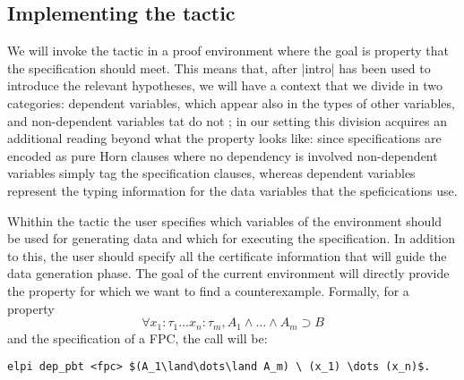 
\subsection{Implementing the tactic}
We will invoke the tactic in a
proof environment  where the goal is %
property that the specification should meet. This means that, after
\lsti|intro| has been used to introduce the relevant hypotheses, we
will have a context %
that we  divide in two categories: dependent
variables, which appear also in the types of other variables, and
non-dependent variables tat do not %
; in our setting this division acquires an additional reading beyond
what the property looks like: since specifications are encoded as pure
Horn clauses where no dependency is involved non-dependent variables
simply tag the specification clauses, whereas dependent variables
represent the typing information for the data variables that the
speficications use.

Whithin the tactic the user
specifies which variables of the environment should be used for
generating data and which for executing the specification. In addition
to this, the user should specify all the certificate information that
will guide the data generation phase. The goal of the current
environment will directly provide the property for which we want to
find a counterexample. %
Formally, for a property
\[
\forall x_1 \colon \tau_1\dots x_n \colon \tau_m, A_1\land\dots\land A_m \supset B
\]
and the specification of a FPC, the call will be:
\begin{lstlisting}
elpi dep_pbt <fpc> $(A_1\land\dots\land A_m) \ (x_1) \dots (x_n)$.
\end{lstlisting}


